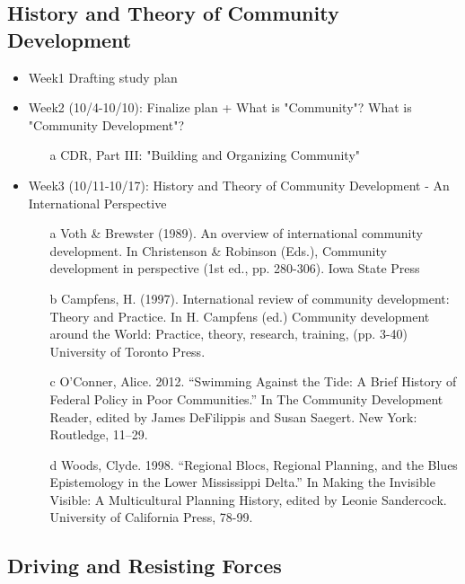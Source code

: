 \documentclass{article}
\begin{document}
\subsection{History and Theory of Community Development}

\begin{itemize}
    \item Week1 Drafting study plan
    \item Week2 (10/4-10/10): Finalize plan + What is "Community"? What is "Community Development"?

        \begin{enumerate}
            \item[a] CDR, Part III: "Building and Organizing Community"
        \end{enumerate}

    \item Week3 (10/11-10/17): History and Theory of Community Development - An International Perspective

        \begin{enumerate}

            \item[a] Voth & Brewster (1989). An overview of international community development. In Christenson & Robinson (Eds.), Community development in perspective (1st ed., pp. 280-306). Iowa State Press
            \item[b] Campfens, H. (1997). International review of community development: Theory and Practice. In H. Campfens (ed.) Community development around the World: Practice, theory, research, training, (pp. 3-40) University of Toronto Press.
            \item[c] O’Conner, Alice. 2012. “Swimming Against the Tide: A Brief History of Federal Policy in Poor Communities.” In The Community Development Reader, edited by James DeFilippis and Susan Saegert. New York: Routledge, 11–29.
            \item[d] Woods, Clyde. 1998. “Regional Blocs, Regional Planning, and the Blues Epistemology in the Lower Mississippi Delta.” In Making the Invisible Visible: A Multicultural Planning History, edited by Leonie Sandercock. University of California Press, 78-99.

        \end{enumerate}
    \end{itemize}

\subsection{Driving and Resisting Forces}
\end{document}

